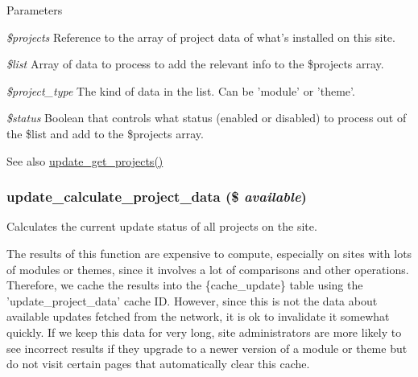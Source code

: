 \begin{DoxyParams}{Parameters}
\item[{\em \$projects}]Reference to the array of project data of what's installed on this site. \item[{\em \$list}]Array of data to process to add the relevant info to the \$projects array. \item[{\em \$project\_\-type}]The kind of data in the list. Can be 'module' or 'theme'. \item[{\em \$status}]Boolean that controls what status (enabled or disabled) to process out of the \$list and add to the \$projects array.\end{DoxyParams}
\begin{DoxySeeAlso}{See also}
\hyperlink{update_8compare_8inc_a7e1ea49d91f2d2b81b8101d481d10300}{update\_\-get\_\-projects()} 
\end{DoxySeeAlso}
\hypertarget{update_8compare_8inc_aa0663304dc4634e4109c896f214ea791}{
\subsubsection[{update\_\-calculate\_\-project\_\-data}]{\setlength{\rightskip}{0pt plus 5cm}update\_\-calculate\_\-project\_\-data (\$ {\em available})}}
\label{update_8compare_8inc_aa0663304dc4634e4109c896f214ea791}
Calculates the current update status of all projects on the site.

The results of this function are expensive to compute, especially on sites with lots of modules or themes, since it involves a lot of comparisons and other operations. Therefore, we cache the results into the \{cache\_\-update\} table using the 'update\_\-project\_\-data' cache ID. However, since this is not the data about available updates fetched from the network, it is ok to invalidate it somewhat quickly. If we keep this data for very long, site administrators are more likely to see incorrect results if they upgrade to a newer version of a module or theme but do not visit certain pages that automatically clear this cache.


